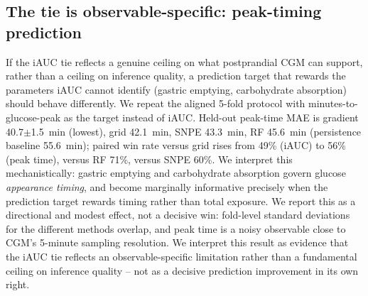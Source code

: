 \documentclass[letterpaper]{article} %
\begin{document}
\subsection{The tie is observable-specific: peak-timing prediction}
If the iAUC tie reflects a genuine ceiling on what postprandial CGM can support, rather than a
ceiling on inference quality, a prediction target that rewards the parameters iAUC cannot identify
(gastric emptying, carbohydrate absorption) should behave differently. We repeat the aligned
5-fold protocol with minutes-to-glucose-peak as the target instead of iAUC. Held-out peak-time MAE
is gradient 40.7$\pm$1.5~min (lowest), grid 42.1~min, SNPE 43.3~min, RF 45.6~min (persistence
baseline 55.6~min); paired win rate versus grid rises from 49\% (iAUC) to 56\% (peak time),
versus RF 71\%, versus SNPE 60\%.
We interpret this mechanistically: gastric emptying and carbohydrate absorption govern glucose
\emph{appearance timing}, and become marginally informative precisely when the prediction target
rewards timing rather than total exposure. We report this as a directional and modest effect, not
a decisive win: fold-level standard deviations for the different methods overlap, and peak time is
a noisy observable close to CGM's 5-minute sampling resolution. We interpret this result as
evidence that the iAUC tie reflects an observable-specific limitation rather than a fundamental
ceiling on inference quality -- not as a decisive prediction improvement in its own right.
\end{document}

